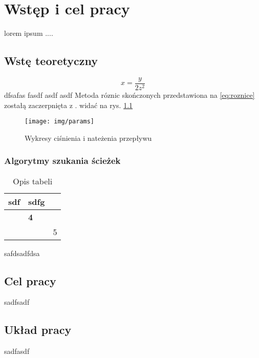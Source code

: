 \chapter{Wstęp i cel pracy}

lorem ipsum ....

\section{Wstę teoretyczny}


\begin{equation}
x = \frac{y}{2z^2}
\label{eq:roznice}
\end{equation}
dfsafas fasdf asdf asdf Metoda róznic skończonych przedstawiona na \ref{eq:roznice} zostałą zaczerpnięta z . widać na rys. \ref{fig:wykresy} 

\begin{figure}[h!]
\centering
\texttt{[image: img/params]}
\caption{Wykresy ciśnienia i nateżenia przepływu}
\label{fig:wykresy}
\end{figure}

\subsection{Algorytmy szukania ścieżek}


\begin{table}[h]
\centering
\caption{Opis tabeli}
\label{tab:tabela1}
\begin{tabular}{|cl|r|}
\hline
sdf & sdfg       &   \\ \hline
    & \textbf{4} &   \\ \hline
    &            & 5 \\ \hline
\end{tabular}
\end{table}

safdsadfdsa

\section{Cel pracy}

sadfsadf

\section{Układ pracy}

sadfasdf
